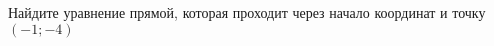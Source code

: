 \begin{ex}
	\begin{condition}
		Найдите уравнение прямой, которая проходит через начало координат и точку \( (-1;-4) \)
	\end{condition}
\end{ex}